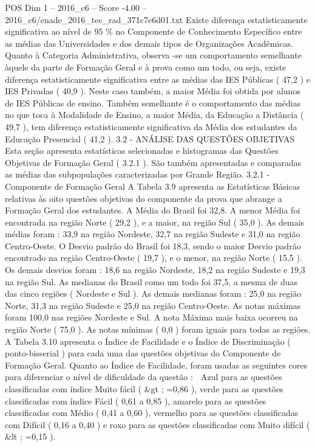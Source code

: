 \begin{textsample}{POS Dim 1 – 2016\_c6 – Score -4.00 – 2016\_c6/enade\_2016\_tec\_rad\_371c7e6d01.txt}
Existe diferença estatisticamente significativa ao nível de 95 \% no Componente de Conhecimento Específico entre as médias das Universidades e dos demais tipos de Organizações Acadêmicas.
Quanto à Categoria Administrativa, observa -se um comportamento semelhante àquele da parte de Formação Geral e à prova como um todo, ou seja, existe diferença estatisticamente significativa entre as médias das IES Públicas ( 47,2 ) e IES Privadas ( 40,9 ).
Neste caso também, a maior Média foi obtida por alunos de IES Públicas de ensino.
Também semelhante é o comportamento das médias no que toca à Modalidade de Ensino, a maior Média, da Educação a Distância ( 49,7 ), tem diferença estatisticamente significativa da Média dos estudantes da Educação Presencial ( 41,2 ). 3.2 - ANÁLISE DAS QUESTÕES OBJETIVAS Esta seção apresenta estatísticas selecionadas e histogramas das Questões Objetivas de Formação Geral ( 3.2.1 ).
São também apresentadas e comparadas as médias das subpopulações caracterizadas por Grande Região. 3.2.1 - Componente de Formação Geral A Tabela 3.9 apresenta as Estatísticas Básicas relativas às oito questões objetivas do componente da prova que abrange a Formação Geral dos estudantes.
A Média do Brasil foi 32,8.
A menor Média foi encontrada na região Norte ( 29,2 ), e a maior, na região Sul ( 35,0 ).
As demais médias foram : 33,9 na região Nordeste, 32,7 na região Sudeste e 31,0 na região Centro-Oeste.
O Desvio padrão do Brasil foi 18,3, sendo o maior Desvio padrão encontrado na região Centro-Oeste ( 19,7 ), e o menor, na região Norte ( 15,5 ).
Os demais desvios foram : 18,6 na região Nordeste, 18,2 na região Sudeste e 19,3 na região Sul.
As medianas do Brasil como um todo foi 37,5, a mesma de duas das cinco regiões ( Nordeste e Sul ).
As demais medianas foram : 25,0 na região Norte, 31,3 na região Sudeste e 25,0 na região Centro-Oeste.
As notas máximas foram 100,0 nas regiões Nordeste e Sul.
A nota Máxima mais baixa ocorreu na região Norte ( 75,0 ).
As notas mínimas ( 0,0 ) foram iguais para todas as regiões.
A Tabela 3.10 apresenta o Índice de Facilidade e o Índice de Discriminação ( ponto-bisserial ) para cada uma das questões objetivas do Componente de Formação Geral.
Quanto ao Índice de Facilidade, foram usadas as seguintes cores para diferenciar o nível de dificuldade da questão :  Azul para as questões classificadas com índice Muito fácil ( \&gt ; =0,86 ), verde para as questões classificadas com índice Fácil ( 0,61 a 0,85 ), amarelo para as questões classificadas com Médio ( 0,41 a 0,60 ), vermelho para as questões classificadas com Difícil ( 0,16 a 0,40 ) e roxo para as questões classificadas com Muito difícil ( \&lt ; =0,15 ).

\end{textsample}
